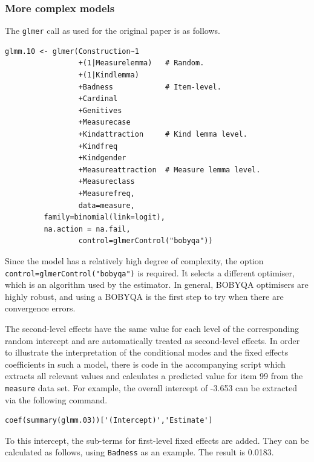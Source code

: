 \subsubsection{More complex models}

The \texttt{glmer} call as used for the original paper is as follows.

\vspace{0.5\baselineskip}

\begin{lstlisting}
glmm.10 <- glmer(Construction~1
                 +(1|Measurelemma)   # Random.
                 +(1|Kindlemma)
                 +Badness            # Item-level.
                 +Cardinal
                 +Genitives
                 +Measurecase
                 +Kindattraction     # Kind lemma level.
                 +Kindfreq
                 +Kindgender
                 +Measureattraction  # Measure lemma level.
                 +Measureclass
                 +Measurefreq,
                 data=measure,
		 family=binomial(link=logit),
		 na.action = na.fail,
                 control=glmerControl("bobyqa"))
\end{lstlisting}

Since the model has a relatively high degree of complexity, the option \texttt{control=glmerControl("bobyqa")} is required.
It selects a different optimiser, which is an algorithm used by the estimator.
In general, BOBYQA optimisers are highly robust, and using a BOBYQA is the first step to try when there are convergence errors.

The second-level effects have the same value for each level of the corresponding random intercept and are automatically treated as second-level effects.
In order to illustrate the interpretation of the conditional modes and the fixed effects coefficients in such a model, there is code in the accompanying script which extracts all relevant values and calculates a predicted value for item 99 from the \texttt{measure} data set.
For example, the overall intercept of -3.653 can be extracted via the following command.

\vspace{0.5\baselineskip}

\begin{lstlisting}
coef(summary(glmm.03))['(Intercept)','Estimate']
\end{lstlisting}

To this intercept, the sub-terms for first-level fixed effects are added.
They can be calculated as follows, using \texttt{Badness} as an example.
The result is 0.0183.

